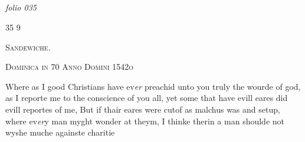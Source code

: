 \documentclass[12pt, a4paper]{book}
\begin{document}
 


            
            
\dotfill
					  \subsection*{}  \subsection*{}  \subsection*{}  \subsection*{}

\textit{folio 035}



 \begin{flushright}{\color{Mahogany}35} 9\end{flushright}
 

	
				\begin{center} \begin{large} {\scshape Sandewiche. } \end{large} \end{center}
			
               
                  
				\begin{center}  {\scshape Dominica in 70 Anno Domini 1542o}  \end{center}
			

	
				\marginpar[\vspace{0.5cm}{\textcolor{Gray}{n}}]{}
			
	
		\ifthenelse{\isodd{\thepage}}
		{\reversemarginpar}
		{\normalmarginpar}
		Where as I good Christians have ev\textit{er} preachid unto you
 truly the wourde of god, as I reporte me to the conscience
 of you all, yet some that have evill eares did evill reportes
 of me, But if thair eares were cutof as malchus was
 and setup, where ev\textit{er}y man myght wonder at theym, I
 thinke therin a man shoulde not wyshe muche againste
 charitie
\end{document}
